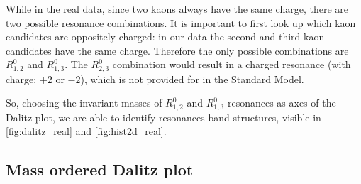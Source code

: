 While in the real data, since two kaons always have the same charge, there are two possible resonance combinations.
It is important to first look up which kaon candidates are oppositely charged: in our data the second and third kaon candidates have the same charge. Therefore the only possible combinations are $R_{1,2}^0$ and $R_{1,3}^0$.
The $R_{2,3}^0$ combination would result in a charged resonance (with charge: $+2$ or $-2$), which is not provided for in the Standard Model.

So, choosing the invariant masses of $R_{1,2}^0$ and $R_{1,3}^0$ resonances as axes of the Dalitz plot, we are able to identify resonances band structures, visible in \autoref{fig:dalitz_real} and \autoref{fig:hist2d_real}.


\subsection{Mass ordered Dalitz plot}

